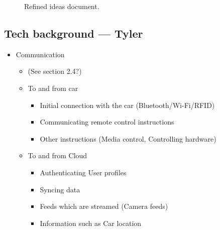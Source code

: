 \documentclass{article}
\begin{document}
\begin{figure}[H]
  \centering
  \caption{Refined ideas document.}\label{refined-ideas}
\end{figure}

\subsection{Tech background --- Tyler}\label{ssec:app-tech}
\begin{itemize}
  \item Communication
    \begin{itemize}
      \item (See section 2.4?)
      \item To and from car
        \begin{itemize}
          \item Initial connection with the car (Bluetooth/Wi-Fi/RFID)
          \item Communicating remote control instructions
          \item Other instructions (Media control, Controlling hardware)
        \end{itemize}
      \item To and from Cloud
        \begin{itemize}
          \item Authenticating User profiles
          \item Syncing data
          \item Feeds which are streamed (Camera feeds)
          \item Information such as Car location
        \end{itemize}
    \end{itemize}
\end{itemize}
\end{document}
